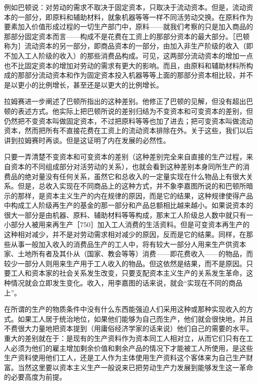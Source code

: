 例如巴顿说：对劳动的需求不取决于固定资本，只取决于流动资本。但是，流动资本的一部分，即原料和辅助材料，就象机器等等一样不同活劳动交换。在原料作为要素加入价值形成过程的一切生产部门中，原料——就我们考察的只是加入商品的那部分固定资本而言——构成不是花费在工资上的那部分资本的最大部分。［巴顿称为］流动资本的另一部分，即商品资本的一部分，由加入非生产阶级的收入（即不加入工人阶级的收入）的那些消费品构成。可见，这两部分流动资本的增加一点也不比固定资本的增加对劳动的需求有更大的影响。而且，由原料和辅助材料所构成的那部分流动资本和作为固定资本投入机器等等上面的那部分资本相比较，并不是以更小的比例增长，甚至还是以更大的比例增长。

拉姆赛进一步阐述了巴顿所指出的这种差别。他修正了巴顿的见解，但没有超出巴顿的表述方式。他实际上把巴顿所说的差别归结为不变资本和可变资本的差别，但仍然把不变资本叫做固定资本，不过把原料等等也加了进去；把可变资本叫做流动资本，然而把所有不直接花费在工资上的流动资本排除在外。关于这些，我们以后讲到拉姆赛时再谈。但是这证明了内在发展的必然性。

只要一弄清楚不变资本和可变资本的差别（这种差别完全来自直接的生产过程，来自资本的不同组成部分对活劳动的关系），也就会看到这种差别本身同所生产的消费品的绝对量没有任何关系，虽然它和总收入的一定量实现在什么物品上有很大关系。但是，总收入实现在不同商品上的这种方式，并不象李嘉图所说的和巴顿所暗示的那样，是资本主义生产的内在规律的原因，而是它的结果，这种规律使得产品中构成工人阶级再生产的基金的那一部分和产品总额相比越来越小。如果说资本的很大一部分是由机器、原料、辅助材料等等构成，那末工人阶级总人数中就只有一小部分人被用来再生产［750］加入工人消费的生活资料。但是可变资本再生产的这种相对减少，并不是对劳动需求相对减少的原因，反而是它的结果。同样，在那些从事一般加入收入的消费品生产的工人中，将有较大一部分人用来生产供资本家、土地所有者及其仆从（国家、教会等等）消费——即花费收入——的物品，而较少一部分人则用来生产用于工人收入的物品。但这依然是结果，而不是原因。只要工人和资本家的社会关系发生改变，只要支配资本主义生产的关系发生革命，这种情况就会立即发生变化。收入，用李嘉图的话来说，就会“实现在不同的商品上”。

在所谓的生产的物质条件中没有什么东西能强迫人们采用这种或那种实现收入的方式。如果工人居于统治地位，如果他们能够为自己而生产，他们就会很快地，并且不费很大力量地把资本提到（用庸俗经济学家的话来说）他们自己的需要的水平。重大的差别就在于：是现有的生产资料作为资本同工人相对立，从而它们只有在工人必须为他们的雇主增加剩余价值和剩余产品的情况下才能被工人所使用，是这些生产资料使用他们工人，还是工人作为主体使用生产资料这个客体来为自己生产财富。当然这里要以资本主义生产一般说来已把劳动生产力发展到能够发生这一革命的必要高度为前提。

